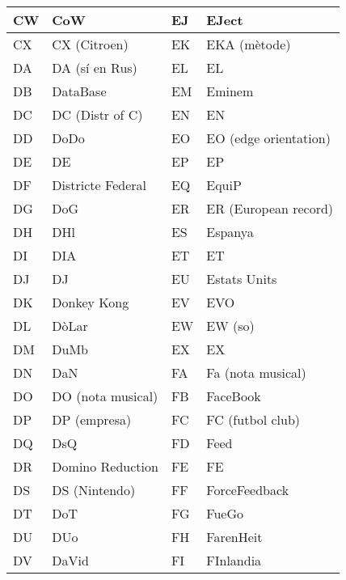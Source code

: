 \begin{table}[h]
    \centering
    \begin{tabular}{llll}
    \hline
    CW & CoW               & EJ & EJect                 \\ \hline 
    CX & CX (Citroen)      & EK & EKA (mètode)          \\ \hline
    DA & DA (sí en Rus)    & EL & EL                    \\ \hline
    DB & DataBase          & EM & Eminem                \\ \hline
    DC & DC (Distr of C)   & EN & EN                    \\ \hline
    DD & DoDo              & EO & EO (edge orientation) \\ \hline
    DE & DE                & EP & EP                    \\ \hline
    DF & Districte Federal & EQ & EquiP                 \\ \hline
    DG & DoG               & ER & ER (European record)  \\ \hline
    DH & DHl               & ES & Espanya               \\ \hline
    DI & DIA               & ET & ET                    \\ \hline
    DJ & DJ                & EU & Estats Units          \\ \hline
    DK & Donkey Kong       & EV & EVO                   \\ \hline
    DL & DòLar             & EW & EW (so)               \\ \hline
    DM & DuMb              & EX & EX                    \\ \hline
    DN & DaN               & FA & Fa (nota musical)     \\ \hline
    DO & DO (nota musical) & FB & FaceBook              \\ \hline
    DP & DP (empresa)      & FC & FC (futbol club)      \\ \hline
    DQ & DsQ               & FD & Feed                  \\ \hline
    DR & Domino Reduction  & FE & FE                    \\ \hline
    DS & DS (Nintendo)     & FF & ForceFeedback         \\ \hline
    DT & DoT               & FG & FueGo                 \\ \hline
    DU & DUo               & FH & FarenHeit             \\ \hline
    DV & DaVid             & FI & FInlandia             \\ \hline

\end{tabular}
\end{table}
